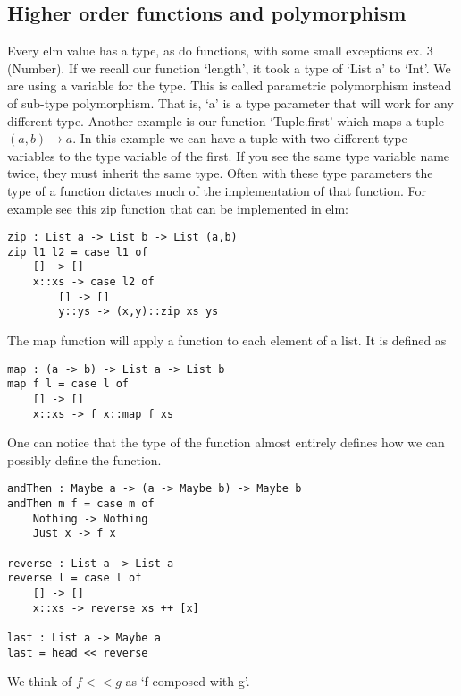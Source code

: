 \documentclass{article}
\theoremstyle{definition}
\begin{document}
\subsection{Higher order functions and polymorphism}
Every elm value has a type, as do functions, with some small exceptions ex. 3 (Number).
If we recall our function `length', it took a type of `List a' to `Int'. We are using a variable 
for the type. This is called parametric polymorphism instead of sub-type polymorphism. That is, `a' is 
a type parameter that will work for any different type. Another example is our function `Tuple.first' which 
maps a tuple $(a,b) \to a$. In this example we can have a tuple with two different type variables to the type 
variable of the first. If you see the same type variable name twice, they must inherit the same type.
Often with these type parameters the type of a function dictates much of the implementation of that function. For example see this zip function that can be implemented in elm:
\begin{mdframed}
	\begin{verbatim}
zip : List a -> List b -> List (a,b)
zip l1 l2 = case l1 of
    [] -> []
    x::xs -> case l2 of
        [] -> []
        y::ys -> (x,y)::zip xs ys
\end{verbatim}
\end{mdframed}
The map function will apply a function to each element of a list. It is defined as
\begin{verbatim}
map : (a -> b) -> List a -> List b
map f l = case l of
    [] -> []
    x::xs -> f x::map f xs
\end{verbatim}
One can notice that the type of the function almost entirely defines how we can possibly define the function.
\begin{verbatim}
andThen : Maybe a -> (a -> Maybe b) -> Maybe b
andThen m f = case m of
    Nothing -> Nothing
    Just x -> f x

reverse : List a -> List a
reverse l = case l of 
    [] -> []
    x::xs -> reverse xs ++ [x]

last : List a -> Maybe a
last = head << reverse
\end{verbatim}
We think of $f << g$ as `f composed with g'.
\end{document}
